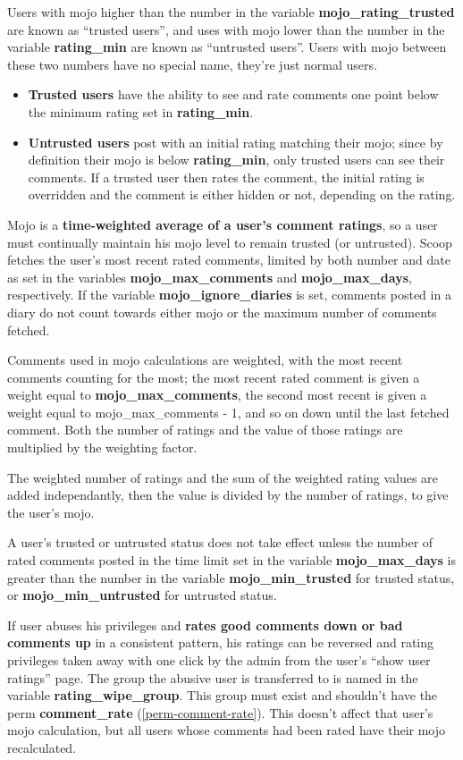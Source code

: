 Users with mojo higher than the number in the variable {\bf mojo\_rating\_trusted} are known as ``trusted users'', and uses with mojo lower than the number in the variable {\bf rating\_min} are known as ``untrusted users''.  Users with mojo between these two numbers have no special name, they're just normal users.  

\begin{itemize}
\item {\bf Trusted users} have the ability to see and rate comments one point below the minimum rating set in {\bf rating\_min}.  
\item {\bf Untrusted users} post with an initial rating matching their mojo; since by definition their mojo is below {\bf rating\_min}, only trusted users can see their comments.  If a trusted user then rates the comment, the initial rating is overridden and the comment is either hidden or not, depending on the rating.
\end{itemize}

Mojo is a {\bf time-weighted average of a user's comment ratings}, so a user must continually maintain his mojo level to remain trusted (or untrusted).  Scoop fetches the user's most recent rated comments, limited by both number and date as set in the variables {\bf mojo\_max\_comments} and {\bf mojo\_max\_days}, respectively.  If the variable {\bf mojo\_ignore\_diaries} is set, comments posted in a diary do not count towards either mojo or the maximum number of comments fetched.

Comments used in mojo calculations are weighted, with the most recent comments counting for the most; the most recent rated comment is given a weight equal to {\bf mojo\_max\_comments}, the second most recent is given a weight equal to mojo\_max\_comments - 1, and so on down until the last fetched comment.  Both the number of ratings and the value of those ratings are multiplied by the weighting factor.  

The weighted number of ratings and the sum of the weighted rating values are added independantly, then the value is divided by the number of ratings, to give the user's mojo.

A user's trusted or untrusted status does not take effect unless the number of rated comments posted in the time limit set in the variable {\bf mojo\_max\_days} is greater than the number in the variable {\bf mojo\_min\_trusted} for trusted status, or {\bf mojo\_min\_untrusted} for untrusted status.

If user abuses his privileges and {\bf rates good comments down or bad comments up} in a consistent pattern, his ratings can be reversed and rating privileges taken away with one click by the admin from the user's ``show user ratings'' page.  The group the abusive user is transferred to is named in the variable {\bf rating\_wipe\_group}.  This group must exist and shouldn't have the perm {\bf comment\_rate} (\ref{perm-comment-rate}).  This doesn't affect that user's mojo calculation, but all users whose comments had been rated have their mojo recalculated.

